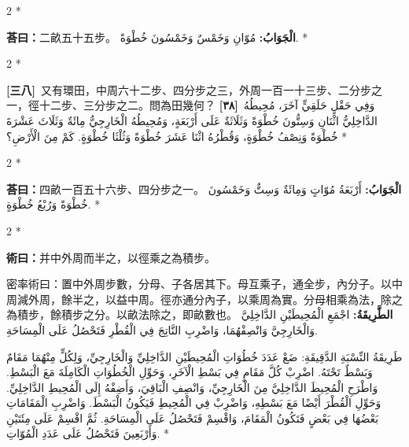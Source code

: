 \documentclass[11pt,a4paper]{article}
\newcommand{\ar}[1]{\arabicfont\beginR #1\endR}
\newcommand{\problemnum}[1]{\textbf{[\ignorespaces#1\unskip]}}
\newenvironment{bilingual}{%
  \begin{paracol}{2}%
  \switchcolumn[0]*%
}{%
  \end{paracol}%
}
\newcommand{\cnline}[1]{\switchcolumn[0]\noindent #1 \switchcolumn[1]}
\newcommand{\arline}[1]{\noindent\ar{#1} \switchcolumn[0]*}
\newenvironment{prob bilingual}{%
  \begin{paracol}{2}%
  \switchcolumn[0]*%
}{%
  \end{paracol}%
  \vspace{0.3em}%
}
\begin{document}
\begin{bilingual}
\cnline{\textcolor{answercolor}{\textbf{荅曰：}}二畝五十五步。}
\arline{\textcolor{answercolor}{\textbf{الْجَوَابُ:}} مُوّانِ وَخَمْسٌ وَخَمْسُونَ خُطْوَةً.}
\end{bilingual}

\begin{bilingual}
\cnline{\problemnum{三八}\, 又有環田，中周六十二步、四分步之三，外周一百一十三步、二分步之一，徑十二步、三分步之二。問為田幾何？}
\arline{\problemnum{٣٨}\, وَفِي حَقْلٍ حَلَقِيٍّ آخَرَ، مُحِيطُهُ الدَّاخِلِيُّ اثْنَانِ وَسِتُّونَ خُطْوَةً وَثَلَاثَةٌ عَلَى أَرْبَعَةٍ، وَمُحِيطُهُ الْخَارِجِيُّ مِائَةٌ وَثَلَاثَ عَشْرَةَ خُطْوَةً وَنِصْفُ خُطْوَةٍ، وَقُطْرُهُ اثْنَا عَشَرَ خُطْوَةً وَثُلْثَا خُطْوَةٍ. كَمْ مِنَ الْأَرْضِ؟}
\end{bilingual}

\begin{bilingual}
\cnline{\textcolor{answercolor}{\textbf{荅曰：}}四畝一百五十六步、四分步之一。}
\arline{\textcolor{answercolor}{\textbf{الْجَوَابُ:}} أَرْبَعَةُ مُوّاتٍ وَمِائَةٌ وَسِتٌّ وَخَمْسُونَ خُطْوَةً وَرُبْعُ خُطْوَةٍ.}
\end{bilingual}

\begin{bilingual}
\cnline{%
\textcolor{methodcolor}{\textbf{術曰：}}并中外周而半之，以徑乘之為積步。

密率術曰：置中外周步數，分母、子各居其下。母互乘子，通全步，內分子。以中周減外周，餘半之，以益中周。徑亦通分內子，以乘周為實。分母相乘為法，除之為積步，餘積步之分。以畝法除之，即畝數也。
}
\arline{%
\textcolor{methodcolor}{\textbf{الطَّرِيقَةُ:}} اجْمَعِ الْمُحِيطَيْنِ الدَّاخِلِيَّ وَالْخَارِجِيَّ وَانْصِفْهُمَا، وَاضْرِبِ النَّاتِجَ فِي الْقُطْرِ فَتَحْصُلُ عَلَى الْمِسَاحَةِ.

طَرِيقَةُ النِّسْبَةِ الدَّقِيقَةِ: ضَعْ عَدَدَ خُطُوَاتِ الْمُحِيطَيْنِ الدَّاخِلِيِّ وَالْخَارِجِيِّ، وَلِكُلٍّ مِنْهُمَا مَقَامٌ وَبَسْطٌ تَحْتَهُ. اضْرِبْ كُلَّ مَقَامٍ فِي بَسْطِ الْآخَرِ، وَحَوِّلِ الْخُطُوَاتِ الْكَامِلَةَ مَعَ الْبَسْطِ. وَاطْرَحِ الْمُحِيطَ الدَّاخِلِيَّ مِنَ الْخَارِجِيِّ، وَانْصِفِ الْبَاقِيَ، وَأَضِفْهُ إِلَى الْمُحِيطِ الدَّاخِلِيِّ. وَحَوِّلِ الْقُطْرَ أَيْضًا مَعَ بَسْطِهِ، وَاضْرِبْ فِي الْمُحِيطِ فَيَكُونُ الْبَسْطَ. وَاضْرِبِ الْمَقَامَاتِ بَعْضُهَا فِي بَعْضٍ فَتَكُونُ الْمَقَامَ، وَاقْسِمْ فَتَحْصُلُ عَلَى الْمِسَاحَةِ. ثُمَّ اقْسِمْ عَلَى مِئَتَيْنِ وَأَرْبَعِينَ فَتَحْصُلُ عَلَى عَدَدِ الْمُوّاتِ.
}
\end{bilingual}
\end{document}

